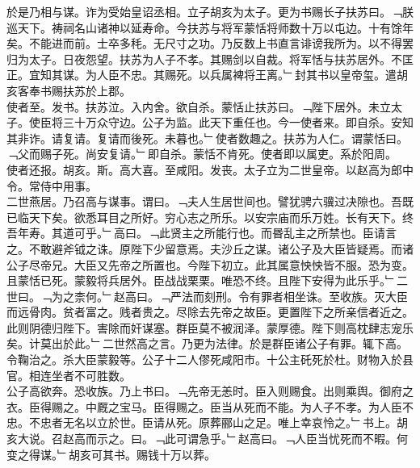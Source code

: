 \documentclass{zhvt-classic}
\begin{document}
\hspace*{2em}於是乃相与谋。诈为受始皇诏丞相。立子胡亥为太子。更为书赐长子扶苏曰。﹁朕巡天下。祷祠名山诸神以延寿命。今扶苏与将军蒙恬将师数十万以屯边。十有馀年矣。不能进而前。士卒多秏。无尺寸之功。乃反数上书直言诽谤我所为。以不得罢归为太子。日夜怨望。扶苏为人子不孝。其赐剑以自裁。将军恬与扶苏居外。不匡正。宜知其谋。为人臣不忠。其赐死。以兵属裨将王离。﹂封其书以皇帝玺。遣胡亥客奉书赐扶苏於上郡。\\
\hspace*{2em}使者至。发书。扶苏泣。入内舍。欲自杀。蒙恬止扶苏曰。﹁陛下居外。未立太子。使臣将三十万众守边。公子为监。此天下重任也。今一使者来。即自杀。安知其非诈。请复请。复请而後死。未暮也。﹂使者数趣之。扶苏为人仁。谓蒙恬曰。﹁父而赐子死。尚安复请。﹂即自杀。蒙恬不肯死。使者即以属吏。系於阳周。\\
\hspace*{2em}使者还报。胡亥。斯。高大喜。至咸阳。发丧。太子立为二世皇帝。以赵高为郎中令。常侍中用事。\\
\hspace*{2em}二世燕居。乃召高与谋事。谓曰。﹁夫人生居世间也。譬犹骋六骥过决隙也。吾既已临天下矣。欲悉耳目之所好。穷心志之所乐。以安宗庙而乐万姓。长有天下。终吾年寿。其道可乎。﹂高曰。﹁此贤主之所能行也。而昬乱主之所禁也。臣请言之。不敢避斧钺之诛。原陛下少留意焉。夫沙丘之谋。诸公子及大臣皆疑焉。而诸公子尽帝兄。大臣又先帝之所置也。今陛下初立。此其属意怏怏皆不服。恐为变。且蒙恬已死。蒙毅将兵居外。臣战战栗栗。唯恐不终。且陛下安得为此乐乎。﹂二世曰。﹁为之柰何。﹂赵高曰。﹁严法而刻刑。令有罪者相坐诛。至收族。灭大臣而远骨肉。贫者富之。贱者贵之。尽除去先帝之故臣。更置陛下之所亲信者近之。此则阴德归陛下。害除而奸谋塞。群臣莫不被润泽。蒙厚德。陛下则高枕肆志宠乐矣。计莫出於此。﹂二世然高之言。乃更为法律。於是群臣诸公子有罪。辄下高。令鞠治之。杀大臣蒙毅等。公子十二人僇死咸阳市。十公主矺死於杜。财物入於县官。相连坐者不可胜数。\\
\hspace*{2em}公子高欲奔。恐收族。乃上书曰。﹁先帝无恙时。臣入则赐食。出则乘舆。御府之衣。臣得赐之。中厩之宝马。臣得赐之。臣当从死而不能。为人子不孝。为人臣不忠。不忠者无名以立於世。臣请从死。原葬郦山之足。唯上幸哀怜之。﹂书上。胡亥大说。召赵高而示之。曰。﹁此可谓急乎。﹂赵高曰。﹁人臣当忧死而不暇。何变之得谋。﹂胡亥可其书。赐钱十万以葬。\\
\end{document}
